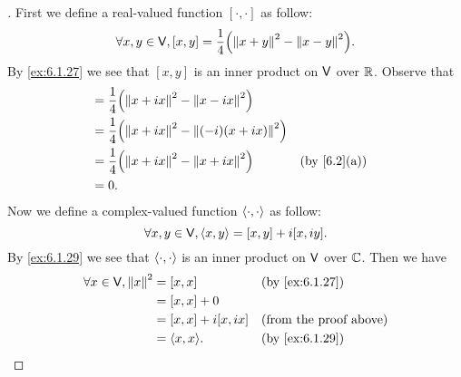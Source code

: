 \begin{proof}[]
  First we define a real-valued function \([\cdot, \cdot]\) as follow:
  \[
    \forall x, y \in \V, [x, y] = \dfrac{1}{4} \pa{\norm{x + y}^2 - \norm{x - y}^2}.
  \]
  By \cref{ex:6.1.27} we see that \([x, y]\) is an inner product on \(\mathsf{V}\) over \(\mathbb{R}\).
  Observe that
  \begin{align*}
    [x, ix] & = \dfrac{1}{4} \pa{\norm{x + ix}^2 - \norm{x - ix}^2}                         \\
            & = \dfrac{1}{4} \pa{\norm{x + ix}^2 - \norm{(-i) (x + ix)}^2}                  \\
            & = \dfrac{1}{4} \pa{\norm{x + ix}^2 - \norm{x + ix}^2}        &  & \by{6.2}[a] \\
            & = 0.
  \end{align*}
  Now we define a complex-valued function \(\left\langle\cdot, \cdot\right\rangle\) as follow:
  \[
    \forall x, y \in \mathsf{V}, \left\langle x, y\right\rangle = [x, y] + i[x, iy].
  \]
  By \cref{ex:6.1.29} we see that \(\left\langle\cdot, \cdot\right\rangle\) is an inner product on \(\mathsf{V}\) over \(\mathbb{C}\).
  Then we have
  \begin{align*}
    \forall x \in \V, \norm{x}^2 & = [x, x]            &  & \by{ex:6.1.27}                \\
                                 & = [x, x] + 0                                           \\
                                 & = [x, x] + i[x, ix] &  & \text{(from the proof above)} \\
                                 & = \inn{x, x}.       &  & \by{ex:6.1.29}
  \end{align*}
\end{proof}

